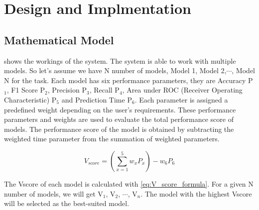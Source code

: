 \documentclass[a4paper,fleqn]{cas-dc}
\begin{document}
\section{Design and Implmentation}\label{sec:design_and_implmentation}

\subsection{Mathematical Model}\label{subsec:mathematical_model}

 shows the workings of the system. The system is able to work with multiple models. So let's assume we have N number of models, Model 1, Model 2,$\cdots$, Model N for the task. Each model has six performance parameters, they are Accuracy P$_1$, F1 Score P$_2$, Precision P$_3$, Recall P$_4$, Area under ROC (Receiver Operating Characteristic) P$_5$ and Prediction Time P$_6$. Each parameter is assigned a predefined weight depending on the user's requirements. These performance parameters and weights are used to evaluate the total performance score of models. The performance score of the model is obtained by subtracting the weighted time parameter from the summation of weighted parameters.

\begin{equation}\label{eq:V_score_formula}
    V_{score} = \left(\sum_{x=1}^5 w_xP_x\right) - w_6P_6
\end{equation}

The Vscore of each model is calculated with \cref{eq:V_score_formula}. For a given N number of models, we will get V$_1$, V$_2$, $\cdots$, V$_n$. The model with the highest Vscore will be selected as the best-suited model.
\end{document}
